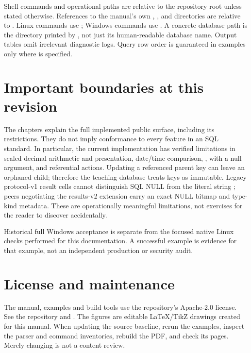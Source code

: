 Shell commands and operational paths are relative to the repository root unless stated otherwise. References to the manual's own , ,  and  directories are relative to .
Linux commands use ; Windows commands use
. A concrete database path is the  directory
printed by , not just its human-readable database name.
Output tables omit irrelevant diagnostic logs. Query row order is guaranteed
in examples only where  is specified.

\section*{Important boundaries at this revision}
The chapters explain the full implemented public surface, including its
restrictions. They do not imply conformance to every feature in an SQL
standard. In particular, the current implementation has verified limitations
in scaled-decimal arithmetic and presentation, date/time comparison,
,  with a null argument, and referential
actions. Updating a referenced parent key can leave an orphaned child;
therefore the teaching database treats keys as immutable. Legacy protocol-v1
result cells cannot distinguish SQL NULL from the literal string
; peers negotiating the results-v2 extension carry an exact NULL
bitmap and type-kind metadata. These are operationally meaningful
limitations, not exercises for the reader to discover accidentally.

Historical full Windows acceptance is separate from the focused native Linux
checks performed for this documentation. A successful example is evidence
for that example, not an independent production or security audit.

\section*{License and maintenance}
The manual, examples and build tools use the repository's Apache-2.0 license.
See the repository  and . The figures are editable
LaTeX/TikZ drawings created for this manual. When updating the source baseline,
rerun the examples, inspect the parser and command inventories, rebuild the
PDF, and check its pages. Merely changing  is not a content
review.

